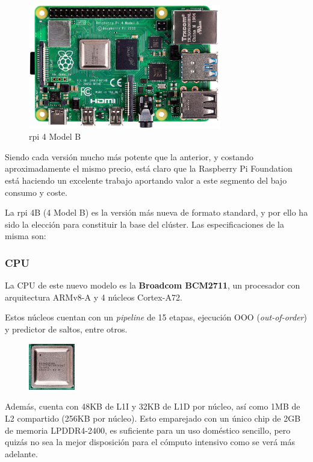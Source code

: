 \begin{figure}[h!]
  \centering
  \includegraphics[width=0.75\textwidth]{img/rpi_parts/rpi_base.jpg}
  \caption{\acrlong{rpi} 4 Model B}
  \label{fig:rpi_base}
\end{figure}

Siendo cada versión mucho más potente que la anterior, y costando aproximadamente el mismo precio, está claro que la Raspberry Pi Foundation está haciendo un excelente trabajo aportando valor a este segmento del bajo consumo y coste.

La \acrlong{rpi} 4B (4 Model B) es la versión más nueva de formato standard, y por ello ha sido la elección para constituir la base del clúster. Las especificaciones de la misma son:

\subsubsection{CPU}
La CPU de este nuevo modelo es la \textbf{Broadcom BCM2711}, un procesador con arquitectura ARMv8-A y 4 núcleos Cortex-A72.

Estos núcleos cuentan con un \textit{pipeline} de 15 etapas, ejecución OOO (\textit{out-of-order}) y predictor de saltos, entre otros.

\begin{figure}
  \centering
  \includegraphics[width=0.18\textwidth]{img/rpi_parts/rpi_cpu.jpg}
  \label{fig:rpi_cpu}
\end{figure}
Además, cuenta con 48KB de L1I y 32KB de L1D por núcleo, así como 1MB de L2 compartido (256KB por núcleo). Esto emparejado con un único chip de 2GB de memoria LPDDR4-2400, es suficiente para un uso doméstico sencillo, pero quizás no sea la mejor disposición para el cómputo intensivo como se verá más adelante.

